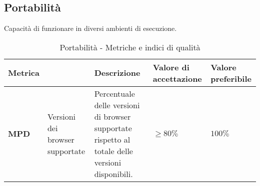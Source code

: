 \subsection{Portabilità}
Capacità di funzionare in diversi ambienti di esecuzione. 
\begin{table}[H]
    \centering
    \begin{tabular}{|C{1.5cm}|L{3cm}|L{4cm}|L{2.5cm}|L{2.5cm}|}
        \hline
        \textbf{Metrica} &  & \textbf{Descrizione} & \textbf{Valore di accettazione} & \textbf{Valore preferibile} \\
        \hline
        \textbf{MPD} & Versioni dei browser supportate & Percentuale delle versioni di browser supportate rispetto al totale delle versioni disponibili. & $\geq 80\%$ & $100\%$ \\
        \hline
    \end{tabular}
    \caption{Portabilità - Metriche e indici di qualità}
    \label{tab:portabilità_qualita_prodotto}
\end{table}
